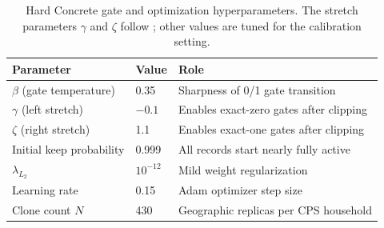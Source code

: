 \begin{table}[ht]
\centering
{\tablefont
\begin{tabular}{lll}
\toprule
Parameter & Value & Role \\
\midrule
$\beta$ (gate temperature) & 0.35 & Sharpness of 0/1 gate transition \\
$\gamma$ (left stretch) & $-0.1$ & Enables exact-zero gates after clipping \\
$\zeta$ (right stretch) & 1.1 & Enables exact-one gates after clipping \\
Initial keep probability & 0.999 & All records start nearly fully active \\
$\lambda_{L_2}$ & $10^{-12}$ & Mild weight regularization \\
Learning rate & 0.15 & Adam optimizer step size \\
Clone count $N$ & 430 & Geographic replicas per CPS household \\
\bottomrule
\end{tabular}
}
\caption{Hard Concrete gate and optimization hyperparameters. The stretch parameters $\gamma$ and $\zeta$ follow \citet{louizos2018}; other values are tuned for the calibration setting.}
\label{tab:hyperparameters}
\end{table}
